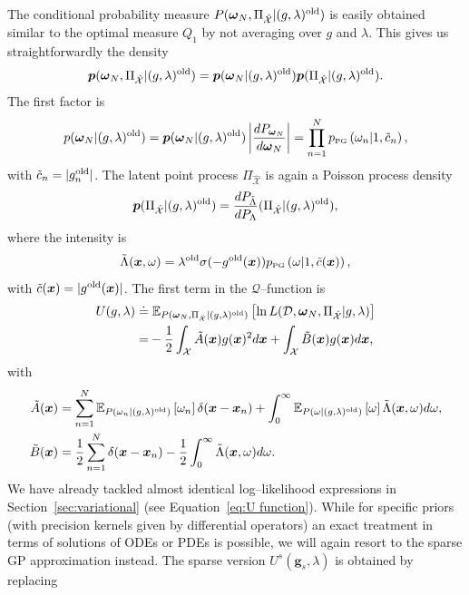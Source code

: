 \documentclass[twoside,11pt]{article}
\newcommand{\dataset}{{\cal D}}
\newcommand{\EE}[2]{\mathbb{E}_{#1}\left[ #2 \right]}
\newcommand{\bs}[1]{\boldsymbol{#1}}
\newcommand{\bx}{\boldsymbol{x}}
\newcommand{\bomega}{\boldsymbol{\omega}}
\newcommand{\bg}{\boldsymbol{g}}
\newcommand{\PG}{p_{\scriptscriptstyle \mathrm{PG}}}
\newcommand{\X}{\mathcal{X}}
\newcommand{\Q}{\mathcal{Q}}
\begin{document}
The conditional probability measure $P(\bomega_N,\Pi_{\hat{\X}}\vert (g,\lambda)^{\rm old})$ is easily obtained similar to the optimal measure $Q_1$ by not averaging over $g$ and $\lambda$. This gives us straightforwardly the density
\begin{equation}
\bs{p}(\bomega_N,\Pi_{\hat{\X}}\vert (g,\lambda)^{\rm old}) = \bs{p}(\bomega_N\vert (g,\lambda)^{\rm old})\bs{p}(\Pi_{\hat{\X}}\vert (g,\lambda)^{\rm old}).
\end{equation}
The first factor is
\begin{equation}
p(\bomega_N\vert  (g,\lambda)^{\rm old}) = \bs{p}(\bomega_N\vert  (g,\lambda)^{\rm old})\left\vert\frac{dP_{\bomega_N}}{d\bomega_N} \right\vert =\prod_{n=1}^N \PG\left(\omega_n \vert 1, \tilde{c}_n\right),
\end{equation}
with $\tilde{c}_n=|g_n^{\rm old}|$. The latent point process $\Pi_{\hat{\X}}$ is again a Poisson process density 
\begin{equation}
\bs{p}(\Pi_{\hat{\X}}\vert (g,\lambda)^{\rm old}) =\frac{dP_{\tilde{\Lambda}}}{dP_\Lambda}(\Pi_{\hat{\X}}\vert (g,\lambda)^{\rm old}),
\end{equation}
where the intensity is
\begin{equation}
\tilde{\Lambda}(\bx,\omega) = \lambda^{\rm old}\sigma(-g^{\rm old}(\bx))\PG\left(\omega \vert 1, \tilde{c}(\bx)\right),
\end{equation}
with $\tilde{c}(\bx) = |g^{\rm old}(\bx)|$. 
The first term in the $\Q$--function is 
\begin{equation}\label{eq:MAP log likelihood}
\begin{split}
U(g,\lambda) \doteq &\; \EE{P(\bomega_N,\Pi_{\hat{\X}}\vert (g,\lambda)^{\rm old})}{\ln L(\dataset,\bomega_N,\Pi_{\hat{\X}}\vert g,\lambda)} \\
= & - \frac{1}{2}\int_{\X} \tilde{A}(\bx)g(\bx)^2 d\bx + \int_\X \tilde{B}(\bx) g(\bx) d\bx,
\end{split}
\end{equation}
with
\begin{align}
\tilde{A}(\bx) & = \sum_{n=1}^N \EE{P(\omega_n\vert (g,\lambda)^{\rm old})}{\omega_n}\delta(\bx - \bx_n) + \int_{0}^\infty \EE{P(\omega\vert (g,\lambda)^{\rm old})}{\omega}\tilde{\Lambda}(\bx,\omega)d\omega, \\
\tilde{B}(\bx) & = \frac{1}{2}\sum_{n=1}^N \delta(\bx - \bx_n) - \frac{1}{2}\int_{0}^\infty \tilde{\Lambda}(\bx,\omega)d\omega.
\end{align}
We have already tackled almost identical log--likelihood expressions in Section~\ref{sec:variational} (see Equation~\eqref{eq:U function}). While for specific priors (with precision kernels given by differential operators) an exact treatment in terms of solutions of ODEs or PDEs is possible, we will again resort to the sparse GP approximation instead. The sparse version $U^s(\bg_s,\lambda)$ is obtained by replacing 
\end{document}
